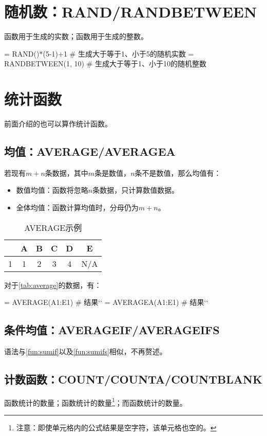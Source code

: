 \section{随机数：RAND/RANDBETWEEN}
函数用于生成的实数；函数用于生成的整数。
\begin{excode}
= RAND()*(5-1)+1  # 生成大于等于1、小于5的随机实数
= RANDBETWEEN(1, 10)  # 生成大于等于1、小于10的随机整数
\end{excode}

\section{统计函数}
前面介绍的也可以算作统计函数。

\subsection{均值：AVERAGE/AVERAGEA}
若现有$m+n$条数据，其中$m$条是数值，$n$条不是数值，那么均值有：
\begin{itemize}
\item 数值均值：函数将忽略$n$条数据，只计算数值数据。
\item 全体均值：函数计算均值时，分母仍为$m+n$。
\end{itemize}

\begin{table}[!hbt]
    \centering
    \caption{AVERAGE示例}\label{tab:average}
    \begin{tabular}{c|ccccc}
    \hline
      & A & B & C & D & E\\
    \hline
    1 & 1 & 2 & 3 & 4 & N/A\\
    \hline
    \end{tabular}
\end{table}

对于\autoref{tab:average}的数据，有：
\begin{excode}
= AVERAGE(A1:E1)  # 结果``
= AVERAGEA(A1:E1)  # 结果``
\end{excode}

\subsection{条件均值：AVERAGEIF/AVERAGEIFS}
语法与\autoref{fun:sumif}以及\autoref{fun:sumifs}相似，不再赘述。

\subsection{计数函数：COUNT/COUNTA/COUNTBLANK}
函数统计的数量；函数统计的数量\footnote{注意：即使单元格内的公式结果是空字符，该单元格也空的。}；而函数统计的数量。

